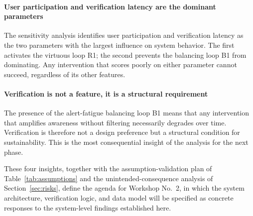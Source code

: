 \documentclass[conference]{IEEEtran}
\begin{document}
\paragraph{User participation and verification latency are the dominant parameters}
The sensitivity analysis identifies user participation and
verification latency as the two parameters with the largest
influence on system behavior. The first activates the virtuous loop
R1; the second prevents the balancing loop B1 from dominating. Any
intervention that scores poorly on either parameter cannot succeed,
regardless of its other features.

\paragraph{Verification is not a feature, it is a structural requirement}
The presence of the alert-fatigue balancing loop B1 means that any
intervention that amplifies awareness without filtering necessarily
degrades over time. Verification is therefore not a design preference
but a structural condition for sustainability. This is the most
consequential insight of the analysis for the next phase.

These four insights, together with the assumption-validation plan of
Table~\ref{tab:assumptions} and the unintended-consequence analysis of
Section~\ref{sec:risks}, define the agenda for Workshop No.~2, in
which the system architecture, verification logic, and data model
will be specified as concrete responses to the system-level findings
established here.
\end{document}
